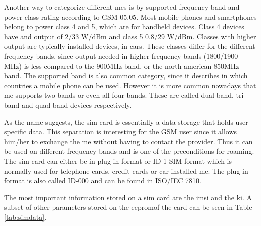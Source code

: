 Another way to categorize different \gls{me}s is by supported frequency band and power class rating according to GSM  05.05\cite{GSM0505}.
Most mobile phones and smartphones belong to power class 4 and 5, which are for handheld devices.
Class 4 devices have and output of 2/33 W/dBm and class 5 0.8/29 W/dBm.
Classes with higher output are typically installed devices, \eg in cars.
These classes differ for the different frequency bands, since output needed in higher frequency bands (1800/1900 MHz) is less compared to the 900MHz band, or the north american 850MHz band.
The supported band is also common category, since it describes in which countries a mobile phone can be used.
However it is more common nowadays that \gls{me} supports two bands or even all four bands.
These are called dual-band, tri-band and quad-band devices respectively.

As the name suggests, the \gls{sim} card is essentially a data storage that holds user specific data.
This separation is interesting for the GSM user since it allows him/her to exchange the \gls{me} without having to contact the provider.
Thus it can be used on different frequency bands and is one of the preconditions for roaming.
The \gls{sim} card can either be in plug-in format or ID-1 SIM format which is normally used for telephone cards, credit cards or car installed \gls{me}.
The plug-in format is also called ID-000 and can be found in ISO/IEC 7810\cite{ISO7810}.

The most important information stored on a \gls{sim} card are the \gls{imsi} and the \gls{ki}.
A subset of other parameters stored on the \gls{eeprom}of the card can be seen in Table \ref{tab:simdata}.

